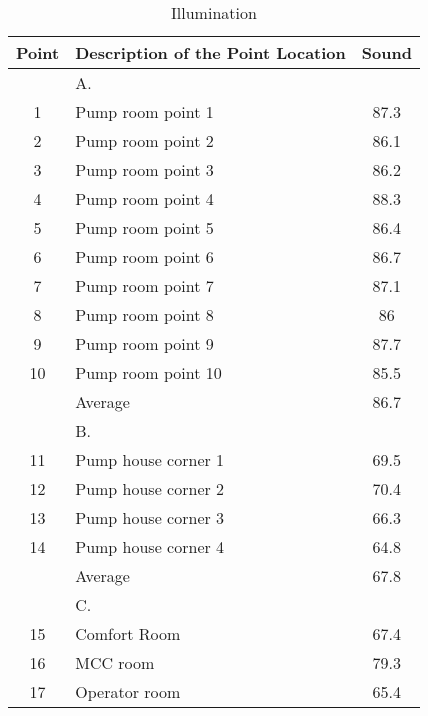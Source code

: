 \begin{table}
	\caption{Illumination}
	\label{ch047_tbl_illumination}
	{\footnotesize


\begin{tabular}{c|l|c}

\hline
Point & Description of the Point Location & Sound \\ 
\hline
 & A. &  \\ 
1 & Pump room point 1 & 87.3 \\ 
2 & Pump room point 2 & 86.1 \\ 
3 & Pump room point 3 & 86.2 \\ 
4 & Pump room point 4 & 88.3 \\ 
5 & Pump room point 5 & 86.4 \\ 
6 & Pump room point 6 & 86.7 \\ 
7 & Pump room point 7 & 87.1 \\ 
8 & Pump room point 8 & 86 \\ 
9 & Pump room point 9 & 87.7 \\ 
10 & Pump room point 10 & 85.5 \\ 
 & Average & 86.7 \\ 
\hline
 & B. &  \\ 
11 & Pump house corner 1 & 69.5 \\ 
12 & Pump house corner 2 & 70.4 \\ 
13 & Pump house corner 3 & 66.3 \\ 
14 & Pump house corner 4 & 64.8 \\ 
 & Average & 67.8 \\ 
\hline
 & C. &  \\ 
15 & Comfort Room & 67.4 \\ 
16 & MCC room & 79.3 \\ 
17 & Operator room & 65.4 \\ 
\hline

\end{tabular}
}
\end{table}